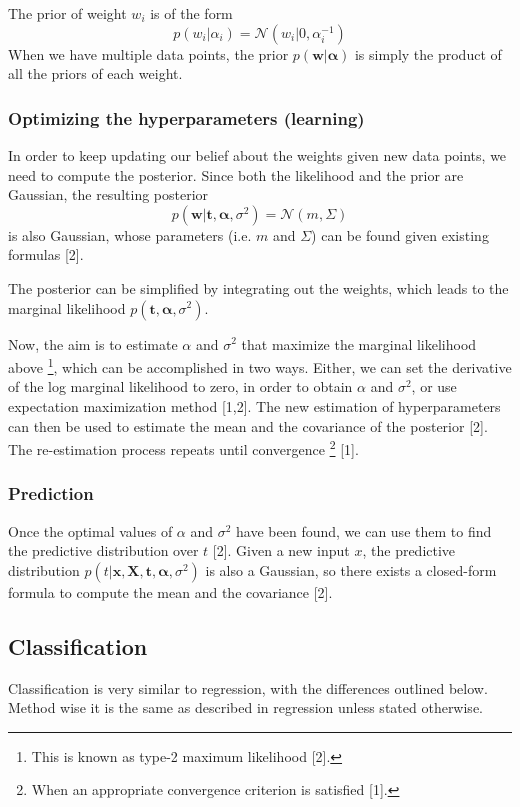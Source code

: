 The prior of weight $w_i$ is of the form
\begin{equation}
p(w_i|\alpha_i)=\mathcal{N}(w_i|0,\alpha_{i}^{-1})
\end{equation}
When we have multiple data points, the prior $p(\boldsymbol{w}|\boldsymbol{\alpha})$ is simply the product of all the priors of each weight.

\subsubsection{Optimizing the hyperparameters (learning)} In order to keep updating our belief about the weights given new data points, we need to compute the posterior. Since both the likelihood and the prior are Gaussian, the resulting posterior
\begin{equation}
p(\boldsymbol{w}|\boldsymbol{t}, \boldsymbol{\alpha}, \sigma^2)=\mathcal{N}(m,\Sigma)
\end{equation}
is also Gaussian, whose parameters (i.e. $m$ and $\Sigma$) can be found given existing formulas [2].

The posterior can be simplified by integrating out the weights, which leads to the marginal likelihood $p(\boldsymbol{t}, \boldsymbol{\alpha}, \sigma^2)$.

Now, the aim is to estimate $\alpha$ and $\sigma^2$ that maximize the marginal likelihood above \footnote{This is known as type-2 maximum likelihood [2].}, which can be accomplished in two ways. Either, we can set the derivative of the log marginal likelihood to zero, in order to obtain $\alpha$ and $\sigma^2$, or use expectation maximization method [1,2]. The new estimation of hyperparameters can then be used to estimate the mean and the covariance of the posterior [2]. The re-estimation process repeats until convergence \footnote{When an appropriate convergence criterion is satisfied [1]. } [1].

\subsubsection{Prediction}
Once the optimal values of $\alpha$ and $\sigma^2$ have been found, we can use them to find the predictive distribution over $t$ [2]. Given a new input $x$, the predictive distribution $p(t|\boldsymbol{x}, \boldsymbol{X}, \boldsymbol{t}, \boldsymbol{\alpha}, \sigma^2)$ is also a Gaussian, so there exists a closed-form formula to compute the mean and the covariance [2].

\subsection{Classification}
Classification is very similar to regression, with the differences outlined below. Method wise it is the same as described in regression unless stated otherwise.

